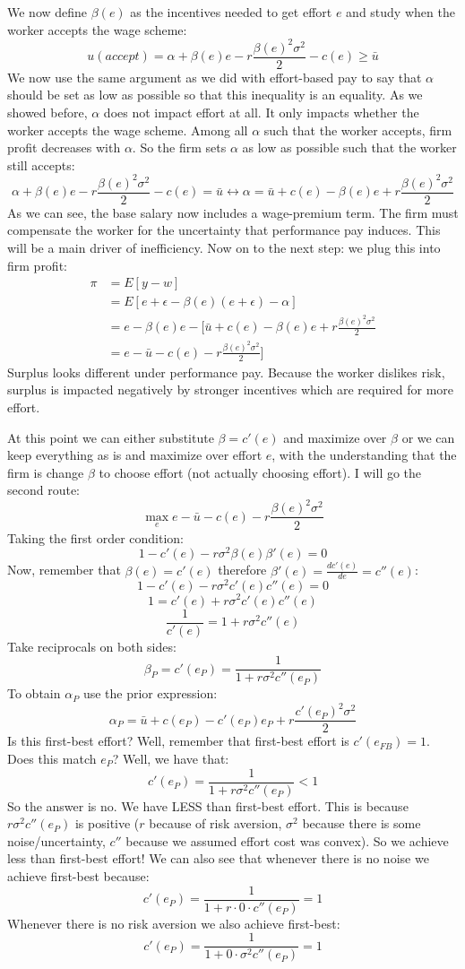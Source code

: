 \documentclass{article}
\begin{document}
We now define $\beta(e)$ as the incentives needed to get effort $e$  and study when the worker accepts the wage scheme:
\[u(accept)=\alpha+ \beta(e) e - r\frac{\beta(e)^2 \sigma^2}{2} - c(e) \geq \bar u \]
We now use the same argument as we did with effort-based pay to say that $\alpha$ should be set as low as possible so that this inequality is an equality. As we showed before, $\alpha$ does not impact effort at all. It only impacts whether the worker accepts the wage scheme. Among all $\alpha$ such that the worker accepts, firm profit decreases with $\alpha$. So the firm sets $\alpha$ as low as possible such that the worker still accepts:
\[\alpha+ \beta(e) e - r\frac{\beta(e)^2 \sigma^2}{2} - c(e) = \bar u \leftrightarrow \alpha = \bar u + c(e)-\beta(e) e+r\frac{\beta(e)^2 \sigma^2}{2}   \]
As we can see, the base salary now includes a wage-premium term. The firm must compensate the worker for the uncertainty that performance pay induces. This will be a main driver of inefficiency. Now on to the next step: we plug this into firm profit:
\begin{align}
    \pi&= E[y-w]\\
    &= E[e+\epsilon - \beta(e) (e+\epsilon) -\alpha ]\\
    &= e - \beta(e) e -[\bar u + c(e)-\beta(e) e+r\frac{\beta(e)^2 \sigma^2}{2}\\
    &= e  -\bar u - c(e)-r\frac{\beta(e)^2 \sigma^2}{2}]
\end{align}
Surplus looks different under performance pay. Because the worker dislikes risk, surplus is impacted negatively by stronger incentives which are required for more effort. 


At this point we can either substitute $\beta = c'(e)$ and maximize over $\beta$ or we can keep everything as is and maximize over effort $e$, with the understanding that the firm is change $\beta$ to choose effort (not actually choosing effort). I will go the second route:
\[\max_e e  -\bar u - c(e)-r\frac{\beta(e)^2 \sigma^2}{2}\]
Taking the first order condition:
\[ 1- c'(e) -r \sigma^2 \beta(e)\beta'(e)=0 \]
Now, remember that $\beta(e) = c'(e)$ therefore $\beta'(e)=\frac{dc'(e)}{de}=c''(e)$:
\[ 1- c'(e) -r \sigma^2 c'(e) c''(e)=0 \]
\[ 1= c'(e) +r \sigma^2 c'(e) c''(e) \]
\[ \frac{1}{c'(e)}= 1+r \sigma^2 c''(e) \]
Take reciprocals on both sides:
\[ \beta_P=c'(e_P)= \frac{1}{1+r \sigma^2 c''(e_P)} \]
To obtain $\alpha_P$ use the prior expression:
\[\alpha_P = \bar u + c(e_P)-c'(e_P) e_P+r\frac{c'(e_P)^2 \sigma^2}{2}   \]
Is this first-best effort? Well, remember that first-best effort is $c'(e_{FB})=1$. Does this match $e_P$? Well, we have that:
\[c'(e_P) =  \frac{1}{1+r \sigma^2 c''(e_P)}<1\]
So the answer is no. We have LESS than first-best effort. This is because $r \sigma^2 c''(e_P)$ is positive ($r$ because of risk aversion, $\sigma^2$ because there is some noise/uncertainty, $c''$ because we assumed effort cost was convex). So we achieve less than first-best effort! We can also see that whenever there is no noise we achieve first-best because:
\[c'(e_P) = \frac{1}{1+r \cdot 0 \cdot c''(e_P)}=1\]
Whenever there is no risk aversion we also achieve first-best:
\[c'(e_P) = \frac{1}{1+0 \cdot\sigma^2c''(e_P)}=1\]
 
\end{document}
